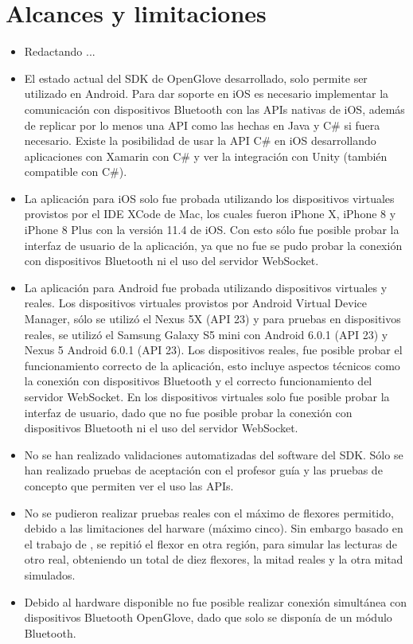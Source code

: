 \section{Alcances y limitaciones}

\begin{itemize}
	\item Redactando ...
	
	\item El estado actual del SDK de OpenGlove desarrollado, solo permite ser utilizado en Android. Para dar soporte en iOS es necesario implementar la comunicación con dispositivos Bluetooth con las APIs nativas de iOS, además de replicar por lo menos una API como las hechas en Java y C\# si fuera necesario. Existe la posibilidad de usar la API C\# en iOS desarrollando aplicaciones con Xamarin con C\# y ver la integración con Unity (también compatible con C\#).
	
	\item La aplicación para iOS solo fue probada utilizando los dispositivos virtuales provistos por el IDE XCode de Mac, los cuales fueron iPhone X, iPhone 8 y iPhone 8 Plus  con la versión 11.4 de iOS. Con esto sólo fue posible probar la interfaz de usuario de la aplicación, ya que no fue se pudo probar la conexión con dispositivos Bluetooth ni el uso del servidor WebSocket.
	
	\item La aplicación para Android fue probada utilizando dispositivos virtuales y reales. Los dispositivos virtuales provistos por Android Virtual Device Manager, sólo se utilizó el Nexus 5X (API 23) y para pruebas en dispositivos reales, se utilizó el Samsung Galaxy S5 mini con Android 6.0.1 (API 23) y Nexus 5 Android 6.0.1 (API 23). Los dispositivos reales, fue posible probar el funcionamiento correcto de la aplicación, esto incluye aspectos técnicos como la conexión con dispositivos Bluetooth y el correcto funcionamiento del servidor WebSocket. En los dispositivos virtuales solo fue posible probar la interfaz de usuario, dado que no fue posible probar la conexión con dispositivos Bluetooth ni el uso del servidor WebSocket.
	
	\item No se han realizado validaciones automatizadas del software del SDK. Sólo se han realizado pruebas de aceptación con el profesor guía y las pruebas de concepto que permiten ver el uso las APIs.
	
	\item No se pudieron realizar pruebas reales con el máximo de flexores permitido, debido a las limitaciones del harware (máximo cinco). Sin embargo basado en el trabajo de \cite{tesis-cerda-rodrigo}, se repitió el flexor en otra región, para simular las lecturas de otro real, obteniendo un total de diez flexores, la mitad reales y la otra mitad simulados.
	
	\item Debido al hardware disponible no fue posible realizar conexión simultánea con dispositivos Bluetooth OpenGlove, dado que solo se disponía de un módulo Bluetooth.
	
	
\end{itemize}